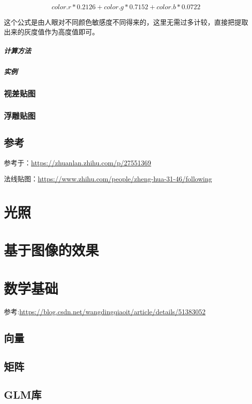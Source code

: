 \documentclass[UTF8,a4paper,12pt]{ctexbook}
\begin{document}
				$$color.r * 0.2126 + color.g * 0.7152 + color.b * 0.0722$$
				
				这个公式是由人眼对不同颜色敏感度不同得来的，这里无需过多计较，直接把提取出来的灰度值作为高度值即可。
			\paragraph{计算方法}
			
			\paragraph{实例}
			
		\subsection{视差贴图}
		
		\subsection{浮雕贴图}
	
	\section{参考}
		参考于：\url{https://zhuanlan.zhihu.com/p/27551369}
		
		法线贴图：\url{https://www.zhihu.com/people/zheng-hua-31-46/following}
		
		
\chapter{光照}


\chapter{基于图像的效果}



\chapter{数学基础}
	参考:\url{https://blog.csdn.net/wangdingqiaoit/article/details/51383052}
	\section{向量}
	
	\section{矩阵}
	
	\section{GLM库}
	


	  
\end{document}
